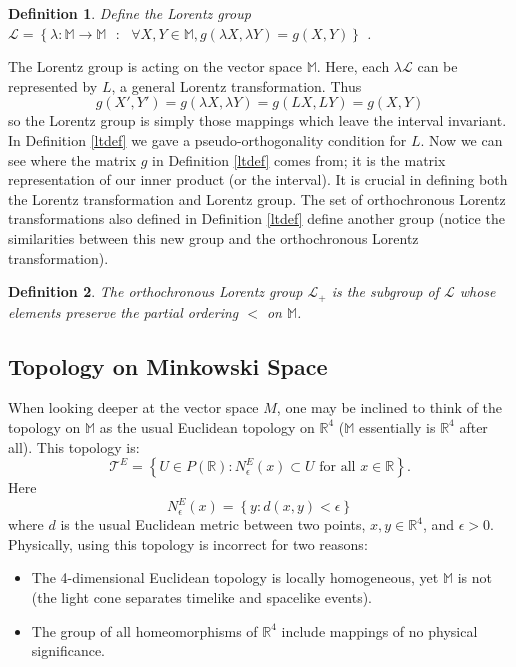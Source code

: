\documentclass[12pt]{article}
\theoremstyle{defn}
\newtheorem{defn}{Definition}
\theoremstyle{pf}
\newcommand{\M}{\mathbb{M}}
\newcommand{\R}{\mathbb{R}}
\newcommand{\lset}{\left\{ }
\newcommand{\rset}{\right\} }
\newcommand{\set}[1]{\lset #1 \rset }
\newcommand{\0}{\emptyset}
\renewcommand{\-}{\setminus}
\begin{document}
\begin{defn}Define the \textit{Lorentz group} $\mathcal{L}=\left\{\lambda:\M\rightarrow\M \mbox{  } : \mbox{  } \forall X,Y\in\M, g(\lambda X,\lambda Y)=g(X,Y)\right\}$ \cite{woodhouse}. \end{defn}

The Lorentz group is acting on the vector space $\M$. Here, each $\lambda\mathcal{L}$ can be represented by $L$, a general Lorentz transformation. Thus $$g(X',Y')=g(\lambda X,\lambda Y)=g(LX,LY)=g(X,Y)$$ so the Lorentz group is simply those mappings which leave the interval invariant. In Definition \ref{ltdef} we gave a pseudo-orthogonality condition for $L$. Now we can see where the matrix $g$ in Definition \ref{ltdef} comes from; it is the matrix representation of our inner product (or the interval). It is crucial in defining both the Lorentz transformation and Lorentz group. The set of orthochronous Lorentz transformations also defined in Definition \ref{ltdef} define another group (notice the similarities between this new group and the orthochronous Lorentz transformation).

\begin{defn}The \textit{orthochronous Lorentz group} $\mathcal{L}_+$ is the subgroup of $\mathcal{L}$ whose elements preserve the partial ordering $<$ on $\M$.\end{defn}

\subsection{Topology on Minkowski Space}

When looking deeper at the vector space $M$, one may be inclined to think of the topology on $\M$ as the usual Euclidean topology on $\R^4$ ($\M$ essentially is $\R^4$ after all). This topology is: $$\mathcal{T}^E=\left\{U\in P(\R):N_\epsilon^E(x)\subset U \mbox{ for all } x\in \R\right\}.$$ Here $$N_\epsilon^E(x)=\left\{y:d(x,y)<\epsilon\right\}$$ where $d$ is the usual Euclidean metric between two points, $x,y\in \R^4$, and $\epsilon>0$. Physically, using this topology is incorrect for two reasons:

\begin{itemize}
 \item[1.] The 4-dimensional Euclidean topology is locally homogeneous, yet $\M$ is not (the light cone separates timelike and spacelike events).
\item[2.] The group of all homeomorphisms of $\R^4$ include mappings of no physical significance.
\end{itemize}
\end{document}
